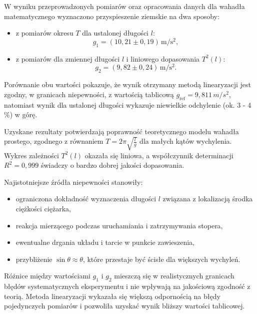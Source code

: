 \documentclass{fizykalab}
\begin{document}
W wyniku przeprowadzonych pomiarów oraz opracowania danych
dla wahadła matematycznego wyznaczono przyspieszenie ziemskie
na dwa sposoby:
\begin{itemize}
  \item z pomiarów okresu \(T\) dla ustalonej długości \(l\):
    \[
      g_1 = (10{,}21 \pm 0{,}19)\,
      \si{\meter\per\second\squared},
    \]
  \item z pomiarów dla zmiennej długości \(l\)
    i liniowego dopasowania \(T^2(l)\):
    \[
      g_2 = (9{,}82 \pm 0{,}24)\,
      \si{\meter\per\second\squared}.
    \]
\end{itemize}

Porównanie obu wartości pokazuje, że wynik otrzymany metodą
linearyzacji jest zgodny, w granicach niepewności, z wartością
tablicową \( g_\text{ref} = 9{,}811\,\si{m/s^2} \),
natomiast wynik dla ustalonej długości wykazuje niewielkie
odchylenie (ok. 3 - 4 \%) w górę.

\bigskip
\noindent
Uzyskane rezultaty potwierdzają poprawność teoretycznego modelu
wahadła prostego, zgodnego z równaniem
\( T = 2\pi\sqrt{\frac{l}{g}} \) dla małych kątów wychylenia.
Wykres zależności \(T^2(l)\) okazała się liniowa, a współczynnik
determinacji \(R^2 = 0{,}999\) świadczy o bardzo dobrej jakości
dopasowania.

\bigskip
\noindent
Najistotniejsze źródła niepewności stanowiły:
\begin{itemize}
  \item ograniczona dokładność wyznaczenia długości \(l\)
    związana z lokalizacją środka ciężkości ciężarka,
  \item reakcja mierzącego podczas uruchamiania i zatrzymywania stopera,
  \item ewentualne drgania układu i tarcie w punkcie zawieszenia,
  \item przybliżenie \(\sin\theta \approx \theta\),
    które przestaje być ścisłe dla większych wychyleń.
\end{itemize}

Różnice między wartościami \(g_1\) i \(g_2\)
mieszczą się w realistycznych granicach błędów systematycznych
eksperymentu i nie wpływają na jakościową zgodność z teorią.
Metoda linearyzacji wykazała się większą odpornością na błędy
pojedynczych pomiarów i pozwoliła uzyskać wynik bliższy wartości
tablicowej.
\end{document}
